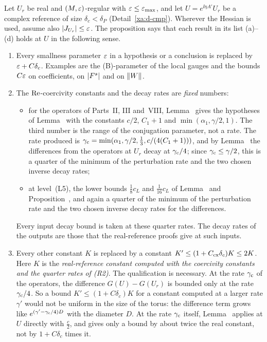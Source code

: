\begin{detail}\label{xa:d-ext-reading}
 Let $U_r$ be real and $(M,\varepsilon)$-regular with $\varepsilon\le\varepsilon_{\max}$, and let $U=e^{\ii\eta A'}U_r$ be a complex reference of size $\delta_c<\delta_P$ (Detail~\ref{xa:d-cmp}). Wherever the Hessian is used, assume also $\lvert J_{U_r}\rvert\le\varepsilon$. The proposition says that each result in its list (a)--(d) holds at $U$ in the following sense.
\begin{enumerate}[label=(R\arabic*)]
\item Every smallness parameter $\varepsilon$ in a hypothesis or a conclusion is replaced by $\varepsilon+C\delta_c$. Examples are the (B)-parameter of the local gauges and the bounds $C\varepsilon$ on coefficients, on $\lvert F^s\rvert$ and on $\lVert W\rVert$.
\item The $\operatorname{Re}$-coercivity constants and the decay rates are \emph{fixed} numbers:
  \begin{itemize}
  \item for the operators of Parts~II, III and~VIII, Lemma~ gives the hypotheses of Lemma~ with the constants $c/2$, $C_1+1$ and $\min(\alpha_1,\gamma/2,1)$. The third number is the range of the conjugation parameter, not a rate. The rate produced is $\gamma_{\rm c}=\min(\alpha_1,\gamma/2,\frac13,c/(4(C_1+1)))$, and by Lemma~ the differences from the operators at $U_r$ decay at $\gamma_{\rm c}/4$; since $\gamma_{\rm c}\le\gamma/2$, this is a quarter of the minimum of the perturbation rate and the two chosen inverse decay rates;
  \item at level~(L5), the lower bounds $\frac18c_L$ and $\frac1{16}c_L$ of Lemma~ and Proposition~, and again a quarter of the minimum of the perturbation rate and the two chosen inverse decay rates for the differences.
  \end{itemize}
  Every input decay bound is taken at these quarter rates. The decay rates of the outputs are those that the real-reference proofs give at such inputs.
\item Every other constant $K$ is replaced by a constant $K'\le(1+C_{\rm cx}\delta_c)K\le2K$. Here $K$ is the \emph{real-reference constant computed with the coercivity constants and the quarter rates of (R2)}. The qualification is necessary. At the rate $\gamma_{\rm c}$ of the operators, the difference $G(U)-G(U_r)$ is bounded only at the rate $\gamma_{\rm c}/4$. So a bound $K'\le(1+C\delta_c)K$ for a constant computed at a larger rate $\gamma'$ would not be uniform in the size of the torus: the difference term grows like $e^{(\gamma'-\gamma_{\rm c}/4)D}$ with the diameter $D$. At the rate $\gamma_{\rm c}$ itself, Lemma~ applies at $U$ directly with $\frac c2$, and gives only a bound by about twice the real constant, not by $1+C\delta_c$ times it.

\end{enumerate}
\end{detail}
